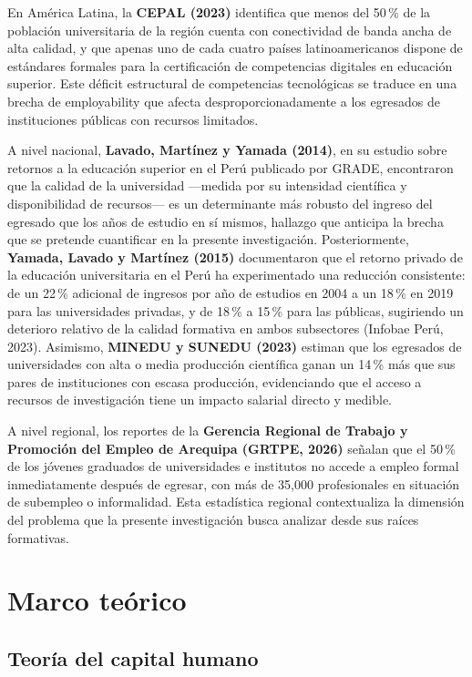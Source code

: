 \documentclass[11pt, a4paper]{article}
\begin{document}
En América Latina, la \textbf{CEPAL (2023)} identifica que menos del 50\,\% de la población universitaria de la región cuenta con conectividad de banda ancha de alta calidad, y que apenas uno de cada cuatro países latinoamericanos dispone de estándares formales para la certificación de competencias digitales en educación superior. Este déficit estructural de competencias tecnológicas se traduce en una brecha de employability que afecta desproporcionadamente a los egresados de instituciones públicas con recursos limitados.

A nivel nacional, \textbf{Lavado, Martínez y Yamada (2014)}, en su estudio sobre retornos a la educación superior en el Perú publicado por GRADE, encontraron que la calidad de la universidad —medida por su intensidad científica y disponibilidad de recursos— es un determinante más robusto del ingreso del egresado que los años de estudio en sí mismos, hallazgo que anticipa la brecha que se pretende cuantificar en la presente investigación. Posteriormente, \textbf{Yamada, Lavado y Martínez (2015)} documentaron que el retorno privado de la educación universitaria en el Perú ha experimentado una reducción consistente: de un 22\,\% adicional de ingresos por año de estudios en 2004 a un 18\,\% en 2019 para las universidades privadas, y de 18\,\% a 15\,\% para las públicas, sugiriendo un deterioro relativo de la calidad formativa en ambos subsectores (Infobae Perú, 2023). Asimismo, \textbf{MINEDU y SUNEDU (2023)} estiman que los egresados de universidades con alta o media producción científica ganan un 14\,\% más que sus pares de instituciones con escasa producción, evidenciando que el acceso a recursos de investigación tiene un impacto salarial directo y medible.

A nivel regional, los reportes de la \textbf{Gerencia Regional de Trabajo y Promoción del Empleo de Arequipa (GRTPE, 2026)} señalan que el 50\,\% de los jóvenes graduados de universidades e institutos no accede a empleo formal inmediatamente después de egresar, con más de 35{,}000 profesionales en situación de subempleo o informalidad. Esta estadística regional contextualiza la dimensión del problema que la presente investigación busca analizar desde sus raíces formativas.

\section{Marco teórico}

\subsection{Teoría del capital humano}
\end{document}
